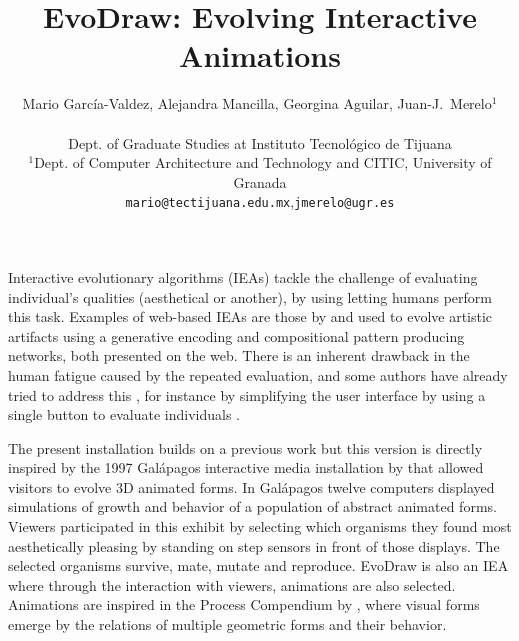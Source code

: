 \documentclass[letterpaper]{article}
\title{EvoDraw: Evolving Interactive Animations}
\author{ Mario Garc\'ia-Valdez, Alejandra Mancilla, Georgina Aguilar, Juan-J.~Merelo$^1$\\
\mbox{}\\
Dept. of Graduate Studies at Instituto Tecnol\'ogico de Tijuana \\
$^1$Dept. of Computer Architecture and Technology and CITIC, 
University of Granada \\
{\tt mario@tectijuana.edu.mx},{\tt jmerelo@ugr.es}}
\begin{document}
\maketitle

Interactive evolutionary algorithms (IEAs) tackle the challenge of evaluating
individual's qualities (aesthetical or another), by using letting humans perform
this task. Examples of web-based IEAs are those by \cite{picbreeder} and
\cite{forms} used to evolve artistic artifacts using a generative encoding and
compositional pattern producing networks,  both presented on the web. There is
an inherent drawback in the human fatigue caused by the repeated evaluation, and
some authors have already tried to address this \citep{Frade:2010:EvoGAMES}, for
instance by simplifying the user interface by using a single button to evaluate
individuals \citep{davies2016evolving}. %

The present installation builds on a previous work \citep{garcia2013evospace}
but this version is directly inspired by the 1997 Galápagos interactive media
installation by \cite{galapagos} that allowed visitors to evolve 3D animated
forms. In Gal{\'a}pagos twelve computers displayed simulations of growth and
behavior of a population of abstract animated forms. Viewers participated in
this exhibit by selecting which organisms they found most aesthetically pleasing
by standing on step sensors in front of those displays. The selected organisms
survive, mate, mutate and reproduce. EvoDraw is also an IEA where through the
interaction with viewers, animations are also selected. Animations are inspired
in the Process Compendium by \cite{reas:2004}, where visual forms emerge by the
relations of multiple geometric forms and their behavior. 
\end{document}
